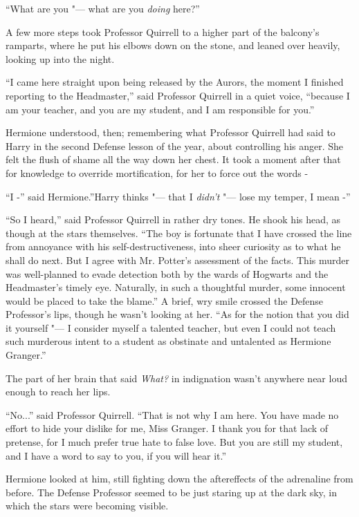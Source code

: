 ``What are you "--- what are you \emph{doing} here?''

A few more steps took Professor Quirrell to a higher part of the
balcony's ramparts, where he put his elbows down on the stone, and
leaned over heavily, looking up into the night.

``I came here straight upon being released by the Aurors, the moment I
finished reporting to the Headmaster,'' said Professor Quirrell in a
quiet voice, ``because I am your teacher, and you are my student, and I
am responsible for you.''

Hermione understood, then; remembering what Professor Quirrell had said
to Harry in the second Defense lesson of the year, about controlling his
anger. She felt the flush of shame all the way down her chest. It took a
moment after that for knowledge to override mortification, for her to
force out the words -

``I -'' said Hermione.''Harry thinks "--- that I \emph{didn't} "--- lose my
temper, I mean -''

``So I heard,'' said Professor Quirrell in rather dry tones. He shook
his head, as though at the stars themselves. ``The boy is fortunate that
I have crossed the line from annoyance with his self-destructiveness,
into sheer curiosity as to what he shall do next. But I agree with Mr.
Potter's assessment of the facts. This murder was well-planned to evade
detection both by the wards of Hogwarts and the Headmaster's timely eye.
Naturally, in such a thoughtful murder, some innocent would be placed to
take the blame.'' A brief, wry smile crossed the Defense Professor's
lips, though he wasn't looking at her. ``As for the notion that you did
it yourself "--- I consider myself a talented teacher, but even I could not
teach such murderous intent to a student as obstinate and untalented as
Hermione Granger.''

The part of her brain that said \emph{What?} in indignation wasn't
anywhere near loud enough to reach her lips.

``No...'' said Professor Quirrell. ``That is not why I am here. You
have made no effort to hide your dislike for me, Miss Granger. I thank
you for that lack of pretense, for I much prefer true hate to false
love. But you are still my student, and I have a word to say to you, if
you will hear it.''

Hermione looked at him, still fighting down the aftereffects of the
adrenaline from before. The Defense Professor seemed to be just staring
up at the dark sky, in which the stars were becoming visible.

